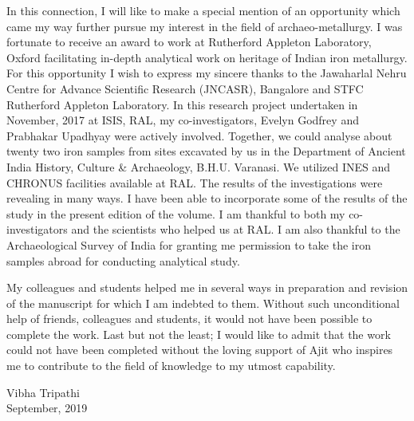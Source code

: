 In this connection, I will like to make a special mention of an opportunity which came my way further pursue my interest in the field of archaeo-metallurgy. I was fortunate to receive an award to work at Rutherford Appleton Laboratory, Oxford facilitating in-depth analytical work on heritage of Indian iron metallurgy. For this opportunity I wish to express my sincere thanks to the Jawaharlal Nehru Centre for Advance Scientific Research   (JNCASR), Bangalore and   STFC Rutherford Appleton Laboratory.  In this research project undertaken in November, 2017 at ISIS, RAL, my co-investigators, Evelyn Godfrey and Prabhakar Upadhyay were actively involved. Together, we could analyse about twenty two iron samples from sites excavated by us in the Department of Ancient India History, Culture \& Archaeology, B.H.U. Varanasi. We utilized INES and CHRONUS facilities available at RAL. The results of the investigations were revealing in many ways. I have been able to incorporate some of the results of the study in the present edition of the volume. I am thankful to both my co-investigators and the scientists who helped us at RAL. I am also thankful to the Archaeological Survey of India for granting me permission to take the iron samples abroad for conducting analytical study. 

My colleagues and students helped me in several ways in preparation and revision of the manuscript for which I am indebted to them. Without such unconditional help of friends, colleagues and students, it would not have been possible to complete the work. Last but not the least; I would like to admit that the work could not have been completed without the loving support of Ajit who inspires me to contribute to the field of knowledge to my utmost capability. 

Vibha Tripathi\\ September, 2019
